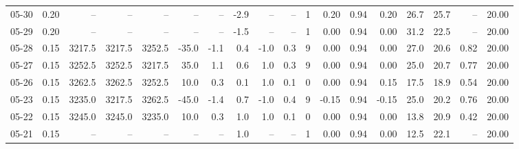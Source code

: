 \begin{threeparttable}
{\begin{tabular}{lrrrrrrrrrrrrrrrrr}
  05-30 &     0.20 &     -- &     -- &     -- &         -- &             -- &                      -2.9 &                       -- &                  -- &              1 &       0.20 &      0.94 &           0.20 &             26.7 &                25.7 &              -- &                  20.00 \\
  05-29 &     0.20 &     -- &     -- &     -- &         -- &             -- &                      -1.5 &                       -- &                  -- &              1 &       0.00 &      0.94 &           0.00 &             31.2 &                22.5 &              -- &                  20.00 \\
  05-28 &     0.15 & 3217.5 & 3217.5 & 3252.5 &      -35.0 &           -1.1 &                       0.4 &                     -1.0 &                 0.3 &              9 &       0.00 &      0.94 &           0.00 &             27.0 &                20.6 &            0.82 &                  20.00 \\
  05-27 &     0.15 & 3252.5 & 3252.5 & 3217.5 &       35.0 &            1.1 &                       0.6 &                      1.0 &                 0.3 &              9 &       0.00 &      0.94 &           0.00 &             25.0 &                20.7 &            0.77 &                  20.00 \\
  05-26 &     0.15 & 3262.5 & 3262.5 & 3252.5 &       10.0 &            0.3 &                       0.1 &                      1.0 &                 0.1 &              0 &       0.00 &      0.94 &           0.15 &             17.5 &                18.9 &            0.54 &                  20.00 \\
  05-23 &     0.15 & 3235.0 & 3217.5 & 3262.5 &      -45.0 &           -1.4 &                       0.7 &                     -1.0 &                 0.4 &              9 &      -0.15 &      0.94 &          -0.15 &             25.0 &                20.2 &            0.76 &                  20.00 \\
  05-22 &     0.15 & 3245.0 & 3245.0 & 3235.0 &       10.0 &            0.3 &                       1.0 &                      1.0 &                 0.1 &              0 &       0.00 &      0.94 &           0.00 &             13.8 &                20.9 &            0.42 &                  20.00 \\
  05-21 &     0.15 &     -- &     -- &     -- &         -- &             -- &                       1.0 &                       -- &                  -- &              1 &       0.00 &      0.94 &           0.00 &             12.5 &                22.1 &              -- &                  20.00 \\

\end{tabular}}
\end{threeparttable}
